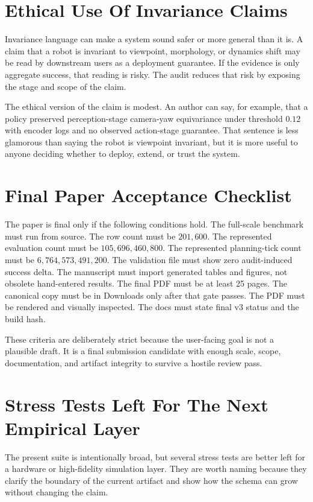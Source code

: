\documentclass{article}
\begin{document}
\section{Ethical Use Of Invariance Claims}

Invariance language can make a system sound safer or more general than it is. A claim that a robot is invariant to viewpoint, morphology, or dynamics shift may be read by downstream users as a deployment guarantee. If the evidence is only aggregate success, that reading is risky. The audit reduces that risk by exposing the stage and scope of the claim.

The ethical version of the claim is modest. An author can say, for example, that a policy preserved perception-stage camera-yaw equivariance under threshold $0.12$ with encoder logs and no observed action-stage guarantee. That sentence is less glamorous than saying the robot is viewpoint invariant, but it is more useful to anyone deciding whether to deploy, extend, or trust the system.

\section{Final Paper Acceptance Checklist}

The paper is final only if the following conditions hold. The full-scale benchmark must run from source. The row count must be $201{,}600$. The represented evaluation count must be $105{,}696{,}460{,}800$. The represented planning-tick count must be $6{,}764{,}573{,}491{,}200$. The validation file must show zero audit-induced success delta. The manuscript must import generated tables and figures, not obsolete hand-entered results. The final PDF must be at least 25 pages. The canonical copy must be in Downloads only after that gate passes. The PDF must be rendered and visually inspected. The docs must state final v3 status and the build hash.

These criteria are deliberately strict because the user-facing goal is not a plausible draft. It is a final submission candidate with enough scale, scope, documentation, and artifact integrity to survive a hostile review pass.

\section{Stress Tests Left For The Next Empirical Layer}

The present suite is intentionally broad, but several stress tests are better left for a hardware or high-fidelity simulation layer. They are worth naming because they clarify the boundary of the current artifact and show how the schema can grow without changing the claim.
\end{document}
